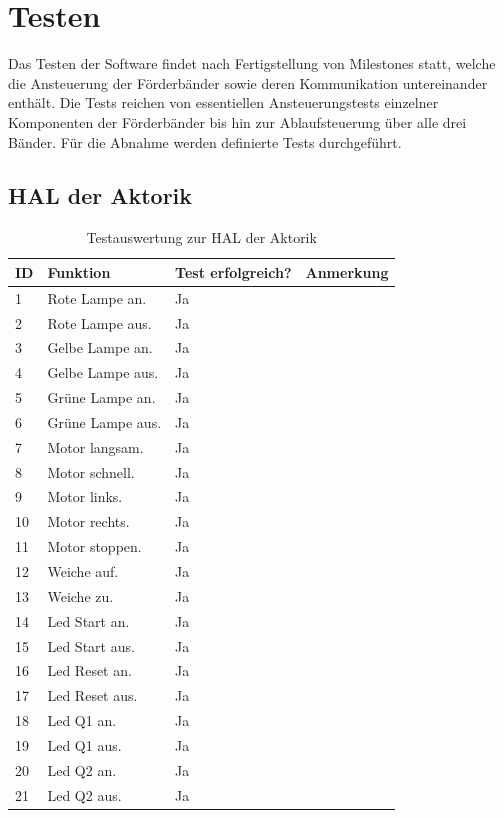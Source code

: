 \documentclass[a4paper, 11pt]{article}
\begin{document}
\newpage

\section{Testen}
Das Testen der Software findet nach Fertigstellung von Milestones statt, welche die Ansteuerung der Förderbänder sowie deren Kommunikation untereinander enthält. Die Tests reichen von essentiellen Ansteuerungstests einzelner Komponenten der Förderbänder bis hin zur Ablaufsteuerung über alle drei Bänder. Für die Abnahme werden definierte Tests durchgeführt.

\subsection{HAL der Aktorik}
\begin{table}[H]
\center
    \begin{tabularx}{\textwidth}{|l|X|X|X|}
        \hline
        \textbf{ID}&\textbf{Funktion}&\textbf{Test erfolgreich?}&\textbf{Anmerkung}\\
        \hline
        1&Rote Lampe an.&Ja&\\
        \hline
        2&Rote Lampe aus.&Ja&\\
        \hline
        3&Gelbe Lampe an.&Ja&\\
        \hline
        4&Gelbe Lampe aus.&Ja&\\
        \hline
        5&Grüne Lampe an.&Ja&\\
        \hline
        6&Grüne Lampe aus.&Ja&\\
        \hline
        7&Motor langsam.&Ja&\\
        \hline
        8&Motor schnell.&Ja&\\
        \hline
        9&Motor links.&Ja&\\
        \hline
        10&Motor rechts.&Ja&\\
        \hline
        11&Motor stoppen.&Ja&\\
        \hline
        12&Weiche auf.&Ja&\\
        \hline
        13&Weiche zu.&Ja&\\
        \hline
        14&Led Start an.&Ja&\\
        \hline
        15&Led Start aus.&Ja&\\
        \hline
        16&Led Reset an.&Ja&\\
        \hline
        17&Led Reset aus.&Ja&\\
        \hline
        18&Led Q1 an.&Ja&\\
        \hline
        19&Led Q1 aus.&Ja&\\
        \hline
        20&Led Q2 an.&Ja&\\
        \hline
        21&Led Q2 aus.&Ja&\\
        \hline
    \end{tabularx}
    \caption{Testauswertung zur HAL der Aktorik}
    \label{tsthal}
\end{table}
\end{document}
